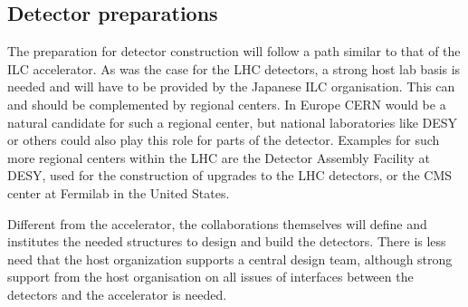 \documentclass[%
 reprint,
 amsmath,amssymb,
 aps,
]{revtex4-1}
\begin{document}
\subsection{Detector preparations~\label{sec:prepphase:detectors}}
The preparation for detector construction will follow a path similar to that of the \acs{ILC} accelerator.
As was the case for the LHC detectors, a strong host lab basis is needed and will have to be provided by the Japanese ILC organisation.
This can and should be complemented by regional centers. In Europe CERN would be a natural candidate for such a regional center, but national laboratories like DESY or others could also play this role for parts of the detector. Examples for such more regional centers within the LHC are the Detector Assembly Facility at DESY, used for the construction of upgrades to the LHC detectors, or the CMS center at Fermilab in the United States. 

Different from the accelerator, the collaborations themselves will define and institutes the needed structures to design and build the detectors. There is less need that the host organization supports a central design team, although strong support from the host organisation on all issues of interfaces between the detectors and the accelerator is needed. 
\end{document}
